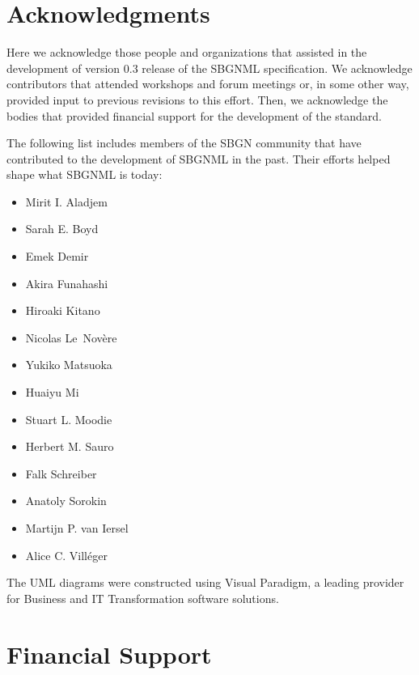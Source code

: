 
\section{Acknowledgments}
\label{acknowledgements}

Here we acknowledge those people and organizations that assisted in the development of version 0.3 release of the SBGNML specification. We acknowledge contributors that attended workshops and forum meetings or, in some other way, provided input to previous revisions to this effort. Then, we acknowledge the bodies that provided financial support for the development of the standard.

The following list includes members of the SBGN community that have contributed to the development of SBGNML in the past. Their efforts helped shape what SBGNML is today:
\begin{itemize}\setlength{\parskip}{-0.2ex}

\item Mirit I. Aladjem
\item Sarah E. Boyd
\item Emek Demir
\item Akira Funahashi
\item Hiroaki Kitano
\item Nicolas Le~Nov\`{e}re
\item Yukiko Matsuoka
\item Huaiyu Mi
\item Stuart L. Moodie
\item Herbert M. Sauro
\item Falk Schreiber
\item Anatoly Sorokin
\item Martijn P. van Iersel
\item Alice C. Vill\'eger

\end{itemize}

The UML diagrams were constructed using Visual Paradigm, a leading provider for Business and IT Transformation software solutions.

\section{Financial Support}

